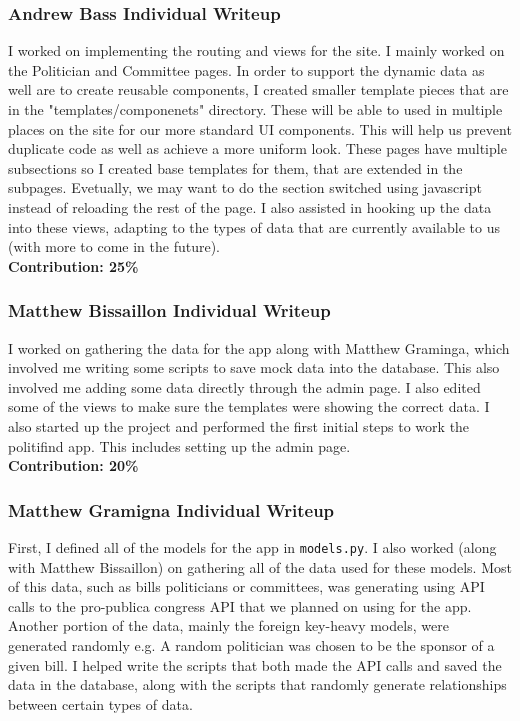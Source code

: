 \documentclass{article}
\newcommand{\n}{\noindent}
\begin{document}
\pagebreak

\subsubsection*{Andrew Bass Individual Writeup}
I worked on implementing the routing and views for the site.  I mainly worked on the Politician and Committee pages.  In order to support the dynamic data as well are to create reusable components, I created smaller template pieces that are in the "templates/componenets" directory.  These will be able to used in multiple places on the site for our more standard UI components.  This will help us prevent duplicate code as well as achieve a more uniform look.  These pages have multiple subsections so I created base templates for them, that are extended in the subpages. Evetually, we may want to do the section switched using javascript instead of reloading the rest of the page. I also assisted in hooking up the data into these views, adapting to the types of data that are currently available to us (with more to come in the future).\\

\n\textbf{Contribution: 25\%}

\pagebreak

\subsubsection*{Matthew Bissaillon Individual Writeup}
I worked on gathering the data for the app along with Matthew Graminga, which involved me writing some scripts to save mock data into the database. This also involved me adding some data directly through the admin page. I also edited some of the views to make sure the templates were showing the correct data. I also started up the project and performed the first initial steps to work the politifind app. This includes setting up the admin page. \\

\n\textbf{Contribution: 20\%}
\pagebreak

\subsubsection*{Matthew Gramigna Individual Writeup}

First, I defined all of the models for the app in \verb|models.py|. I also worked (along with Matthew Bissaillon) on gathering all of the data used for these models. Most of this data, such as bills politicians or committees, was generating using API calls to the pro-publica congress API that we planned on using for the app.  Another portion of the data, mainly the foreign key-heavy models, were generated randomly e.g. A random politician was chosen to be the sponsor of a given bill. I helped write the scripts that both made the API calls and saved the data in the database, along with the scripts that randomly generate relationships between certain types of data.
\end{document}
